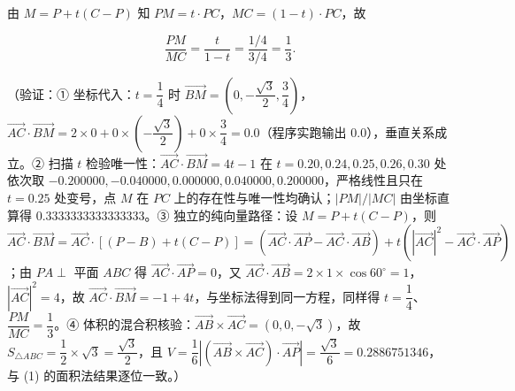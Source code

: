 \begin{answer}
由 \(M=P+t(C-P)\) 知 \(PM=t\cdot PC\)，\(MC=(1-t)\cdot PC\)，故

\nopagebreak[4]
\[
\dfrac{PM}{MC}=\dfrac{t}{1-t}=\dfrac{1/4}{3/4}=\dfrac{1}{3} .
\]

（验证：① 坐标代入：\(t=\dfrac{1}{4}\) 时 \(\overrightarrow{BM}=\left(0,-\dfrac{\sqrt{3}}{2},\dfrac{3}{4}\right)\)，\(\overrightarrow{AC}\cdot\overrightarrow{BM}=2\times0+0\times\left(-\dfrac{\sqrt{3}}{2}\right)+0\times\dfrac{3}{4}=0.0\)（程序实跑输出 \(0.0\)），垂直关系成立。② 扫描 \(t\) 检验唯一性：\(\overrightarrow{AC}\cdot\overrightarrow{BM}=4t-1\) 在 \(t=0.20,0.24,0.25,0.26,0.30\) 处依次取 \(-0.200000,-0.040000,0.000000,0.040000,0.200000\)，严格线性且只在 \(t=0.25\) 处变号，点 \(M\) 在 \(PC\) 上的存在性与唯一性均确认；\(|PM|/|MC|\) 由坐标直算得 \(0.3333333333333333\)。③ 独立的纯向量路径：设 \(M=P+t(C-P)\)，则 \(\overrightarrow{AC}\cdot\overrightarrow{BM}=\overrightarrow{AC}\cdot\left[(P-B)+t(C-P)\right]=\left(\overrightarrow{AC}\cdot\overrightarrow{AP}-\overrightarrow{AC}\cdot\overrightarrow{AB}\right)+t\left(|\overrightarrow{AC}|^2-\overrightarrow{AC}\cdot\overrightarrow{AP}\right)\)；由 \(PA\perp\) 平面 \(ABC\) 得 \(\overrightarrow{AC}\cdot\overrightarrow{AP}=0\)，又 \(\overrightarrow{AC}\cdot\overrightarrow{AB}=2\times1\times\cos60^{\circ}=1\)，\(|\overrightarrow{AC}|^2=4\)，故 \(\overrightarrow{AC}\cdot\overrightarrow{BM}=-1+4t\)，与坐标法得到同一方程，同样得 \(t=\dfrac{1}{4}\)、\(\dfrac{PM}{MC}=\dfrac{1}{3}\)。④ 体积的混合积核验：\(\overrightarrow{AB}\times\overrightarrow{AC}=(0,0,-\sqrt{3})\)，故 \(S_{\triangle ABC}=\dfrac{1}{2}\times\sqrt{3}=\dfrac{\sqrt{3}}{2}\)，且 \(V=\dfrac{1}{6}\left|(\overrightarrow{AB}\times\overrightarrow{AC})\cdot\overrightarrow{AP}\right|=\dfrac{\sqrt{3}}{6}=0.2886751346\)，与 (1) 的面积法结果逐位一致。）



\end{answer}
